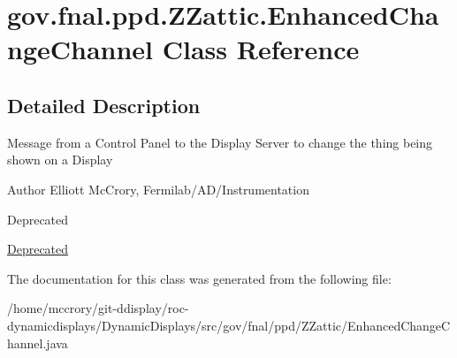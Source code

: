 \hypertarget{classgov_1_1fnal_1_1ppd_1_1ZZattic_1_1EnhancedChangeChannel}{\section{gov.\-fnal.\-ppd.\-Z\-Zattic.\-Enhanced\-Change\-Channel Class Reference}
\label{classgov_1_1fnal_1_1ppd_1_1ZZattic_1_1EnhancedChangeChannel}
}


\subsection{Detailed Description}
Message from a Control Panel to the Display Server to change the thing being shown on a Display

\begin{DoxyAuthor}{Author}
Elliott Mc\-Crory, Fermilab/\-A\-D/\-Instrumentation 
\end{DoxyAuthor}
\begin{DoxyRefDesc}{Deprecated}
\item[\hyperlink{deprecated__deprecated000014}{Deprecated}]\end{DoxyRefDesc}


The documentation for this class was generated from the following file\-:\begin{DoxyCompactItemize}
\item 
/home/mccrory/git-\/ddisplay/roc-\/dynamicdisplays/\-Dynamic\-Displays/src/gov/fnal/ppd/\-Z\-Zattic/Enhanced\-Change\-Channel.\-java\end{DoxyCompactItemize}
